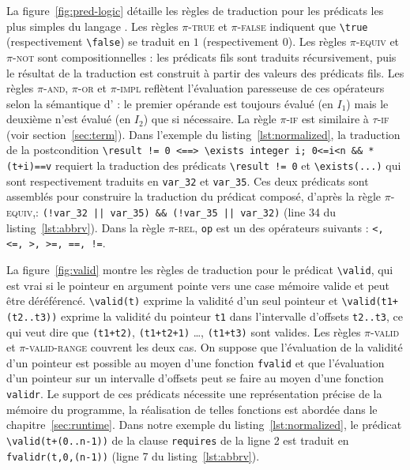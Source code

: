 La figure~\ref{fig:pred-logic} détaille les règles de traduction pour les
prédicats les plus simples du langage \eacsl.
Les règles \textsc{$\pi$-true} et \textsc{$\pi$-false} indiquent que
\lstinline'\true' (respectivement \lstinline'\false') se traduit en $1$
(respectivement $0$).
Les règles \textsc{$\pi$-equiv} et \textsc{$\pi$-not} sont compositionnelles :
les prédicats fils sont traduits récursivement, puis le résultat de la
traduction est construit à partir des valeurs des prédicats fils.
Les règles \textsc{$\pi$-and}, \textsc{$\pi$-or} et \textsc{$\pi$-impl}
reflètent l'évaluation paresseuse de ces opérateurs selon la sémantique d'\eacsl
: le premier opérande est toujours évalué (en $I_1$) mais le deuxième n'est
évalué (en $I_2$) que si nécessaire.
La règle \textsc{$\pi$-if} est similaire à \textsc{$\tau$-if} (voir
section~\ref{sec:term}).
Dans l'exemple du listing~\ref{lst:normalized}, la traduction de la
postcondition
\lstinline{\result != 0 <==> \exists integer i; 0<=i<n && *(t+i)==v} requiert
la traduction des prédicats \lstinline|\result != 0| et
\lstinline{\exists(...)} qui sont respectivement traduits en \lstinline|var_32|
et \lstinline|var_35|.
Ces deux prédicats sont assemblés pour construire la traduction du prédicat
composé, d'après la règle \textsc{$\pi$-equiv},:
\lstinline{(!var_32 || var_35) && (!var_35 || var_32)} (line 34 du
listing~\ref{lst:abbrv}).
Dans la règle \textsc{$\pi$-rel}, \lstinline|op| est un des opérateurs suivants
: \lstinline[style=c]{<, <=, >, >=, ==, !=}.

La figure~\ref{fig:valid} montre les règles de traduction pour le prédicat
\lstinline|\valid|, qui est vrai si le pointeur en argument pointe vers une
case mémoire valide et peut être déréférencé.
\lstinline'\valid(t)' exprime la validité d'un seul pointeur et
\lstinline'\valid(t1+(t2..t3))' exprime la validité du pointeur \lstinline't1'
dans l'intervalle d'offsets \lstinline't2..t3', ce qui veut dire que
\lstinline'(t1+t2)', \lstinline'(t1+t2+1)' \dots, \lstinline'(t1+t3)' sont
valides.
Les règles \textsc{$\pi$-valid} et \textsc{$\pi$-valid-range} couvrent les deux
cas.
On suppose que l'évaluation de la validité d'un pointeur est possible au moyen
d'une fonction \lstinline'fvalid' et que l'évaluation d'un pointeur sur un
intervalle d'offsets peut se faire au moyen d'une fonction
\lstinline'validr'.
Le support de ces prédicats nécessite une représentation précise de la mémoire
du programme, la réalisation de telles fonctions est abordée dans le
chapitre~\ref{sec:runtime}.
Dans notre exemple du listing~\ref{lst:normalized}, le prédicat
\lstinline|\valid(t+(0..n-1))| de la clause \lstinline|requires| de la ligne 2
est traduit en \lstinline[style=c]|fvalidr(t,0,(n-1))| (ligne 7 du
listing~\ref{lst:abbrv}).

